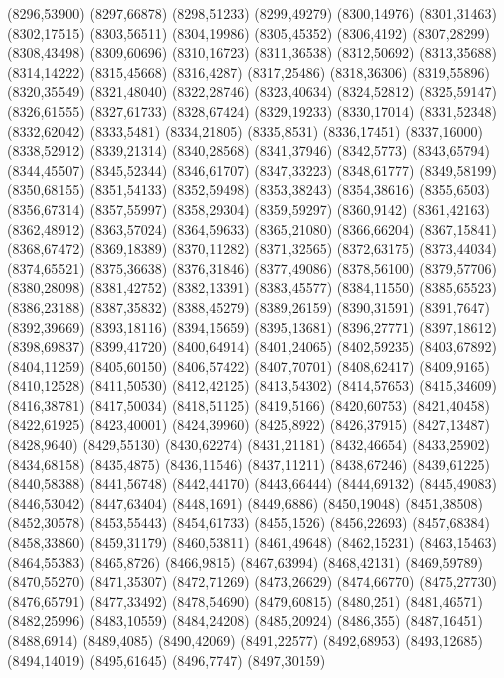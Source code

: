 (8296,53900)
(8297,66878)
(8298,51233)
(8299,49279)
(8300,14976)
(8301,31463)
(8302,17515)
(8303,56511)
(8304,19986)
(8305,45352)
(8306,4192)
(8307,28299)
(8308,43498)
(8309,60696)
(8310,16723)
(8311,36538)
(8312,50692)
(8313,35688)
(8314,14222)
(8315,45668)
(8316,4287)
(8317,25486)
(8318,36306)
(8319,55896)
(8320,35549)
(8321,48040)
(8322,28746)
(8323,40634)
(8324,52812)
(8325,59147)
(8326,61555)
(8327,61733)
(8328,67424)
(8329,19233)
(8330,17014)
(8331,52348)
(8332,62042)
(8333,5481)
(8334,21805)
(8335,8531)
(8336,17451)
(8337,16000)
(8338,52912)
(8339,21314)
(8340,28568)
(8341,37946)
(8342,5773)
(8343,65794)
(8344,45507)
(8345,52344)
(8346,61707)
(8347,33223)
(8348,61777)
(8349,58199)
(8350,68155)
(8351,54133)
(8352,59498)
(8353,38243)
(8354,38616)
(8355,6503)
(8356,67314)
(8357,55997)
(8358,29304)
(8359,59297)
(8360,9142)
(8361,42163)
(8362,48912)
(8363,57024)
(8364,59633)
(8365,21080)
(8366,66204)
(8367,15841)
(8368,67472)
(8369,18389)
(8370,11282)
(8371,32565)
(8372,63175)
(8373,44034)
(8374,65521)
(8375,36638)
(8376,31846)
(8377,49086)
(8378,56100)
(8379,57706)
(8380,28098)
(8381,42752)
(8382,13391)
(8383,45577)
(8384,11550)
(8385,65523)
(8386,23188)
(8387,35832)
(8388,45279)
(8389,26159)
(8390,31591)
(8391,7647)
(8392,39669)
(8393,18116)
(8394,15659)
(8395,13681)
(8396,27771)
(8397,18612)
(8398,69837)
(8399,41720)
(8400,64914)
(8401,24065)
(8402,59235)
(8403,67892)
(8404,11259)
(8405,60150)
(8406,57422)
(8407,70701)
(8408,62417)
(8409,9165)
(8410,12528)
(8411,50530)
(8412,42125)
(8413,54302)
(8414,57653)
(8415,34609)
(8416,38781)
(8417,50034)
(8418,51125)
(8419,5166)
(8420,60753)
(8421,40458)
(8422,61925)
(8423,40001)
(8424,39960)
(8425,8922)
(8426,37915)
(8427,13487)
(8428,9640)
(8429,55130)
(8430,62274)
(8431,21181)
(8432,46654)
(8433,25902)
(8434,68158)
(8435,4875)
(8436,11546)
(8437,11211)
(8438,67246)
(8439,61225)
(8440,58388)
(8441,56748)
(8442,44170)
(8443,66444)
(8444,69132)
(8445,49083)
(8446,53042)
(8447,63404)
(8448,1691)
(8449,6886)
(8450,19048)
(8451,38508)
(8452,30578)
(8453,55443)
(8454,61733)
(8455,1526)
(8456,22693)
(8457,68384)
(8458,33860)
(8459,31179)
(8460,53811)
(8461,49648)
(8462,15231)
(8463,15463)
(8464,55383)
(8465,8726)
(8466,9815)
(8467,63994)
(8468,42131)
(8469,59789)
(8470,55270)
(8471,35307)
(8472,71269)
(8473,26629)
(8474,66770)
(8475,27730)
(8476,65791)
(8477,33492)
(8478,54690)
(8479,60815)
(8480,251)
(8481,46571)
(8482,25996)
(8483,10559)
(8484,24208)
(8485,20924)
(8486,355)
(8487,16451)
(8488,6914)
(8489,4085)
(8490,42069)
(8491,22577)
(8492,68953)
(8493,12685)
(8494,14019)
(8495,61645)
(8496,7747)
(8497,30159)

